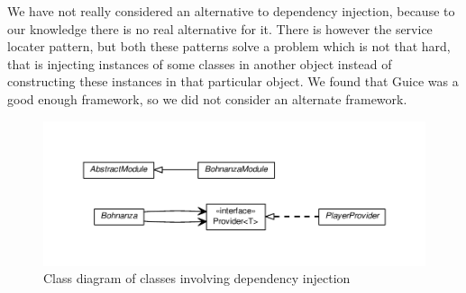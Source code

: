 We have not really considered an alternative to dependency injection, because to our knowledge there is no real alternative
for it. There is however the service locater pattern, but both these patterns solve a problem which
is not that hard, that is injecting instances of some classes in another object instead of
constructing these instances in that particular object. We found that Guice was a good enough
framework, so we did not consider an alternate framework. 

\begin{figure}[h!]
    \includegraphics[width=\textwidth]{../umlgraph/ModuleGraph}
    \caption{Class diagram of classes involving dependency injection}
    \label{fig:design:di}
\end{figure}
